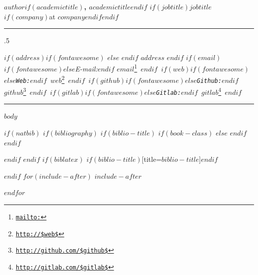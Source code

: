 \documentclass[$if(fontsize)$$fontsize$,$endif$$if(lang)$$babel-lang$,$endif$$if(papersize)$$papersize$paper,$endif$$for(classoption)$$classoption$$sep$,$endfor$]{$documentclass$}
\renewcommand{\href}[2]{#2\footnote{\url{#1}}}
\begin{document}
{\Large \bf $author$$if(academictitle)${\large,  $academictitle$}$endif$} \hfill $if(jobtitle)${\large $jobtitle$ $if(company)${\large at \emph{$company$}}$endif$}$endif$  

\vspace{3 mm}

\hrule

\vspace{2 mm}

\moveleft.5\hoffset\centerline{ $if(address)$$if(fontawesome)$\faHome \hspace{0.5 mm} $else$ $endif$ {\small \tt $address$} \hspace{1 mm}$endif$ 
$if(email)$$if(fontawesome)$\faEnvelopeO \hspace{0.5 mm}$else$\emph{E-mail:}$endif$ \href{mailto:}{\small \tt $email$} \hspace{1 mm}$endif$ 
$if(web)$$if(fontawesome)$\faUser \hspace{ 0.5 mm}$else$\emph{Web:}$endif$ \href{http://$web$}{\small  \tt $web$} \hspace{1 mm} $endif$
$if(github)$$if(fontawesome)$\faGithub \hspace{0.5 mm}$else$\emph{Github:}$endif$ \href{http://github.com/$github$}{\small \tt $github$} \hspace{1 mm} $endif$
$if(gitlab)$$if(fontawesome)$\faGitlab \hspace{0.5 mm}$else$\emph{Gitlab:}$endif$ \href{http://gitlab.com/$gitlab$}{\small \tt $gitlab$} \hspace{1 mm} $endif$ }




\vspace{2 mm}

\hrule


$body$

$if(natbib)$
$if(bibliography)$
$if(biblio-title)$
$if(book-class)$
\renewcommand\bibname{$biblio-title$}
$else$
\renewcommand\refname{$biblio-title$}
$endif$
$endif$


$endif$
$endif$
$if(biblatex)$
\printbibliography$if(biblio-title)$[title=$biblio-title$]$endif$

$endif$
$for(include-after)$
$include-after$

$endfor$
\end{document}
